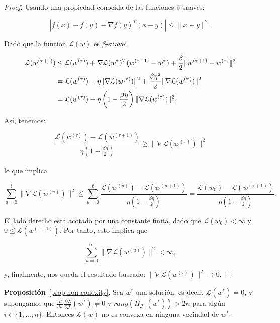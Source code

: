 \begin{proof}
  Usando una propiedad conocida de las funciones $\beta$-suaves:

  \[
      | f(x) - f(y) - \nabla f(y)^{T} (x-y) | \leq \| x - y \|^2.
  \]  

  Dado que la función $\mathcal{L}(w)$ es $\beta$-suave:

  \begin{align}
      \mathcal{L} (w^{(\tau + 1)}) &\leq \mathcal{L} (w^{(\tau)}) + \nabla \mathcal{L} (w^{\tau})^{T} (w^{(\tau + 1)} - w^{\tau}) + \frac{\beta}{2} \|w^{(\tau + 1)} - w^{(\tau)}\|^2 \notag \\
      &= \mathcal{L} (w^{(\tau)}) - \eta \|\nabla \mathcal{L} (w^{(\tau)})\|^2 + \frac{\beta \eta^2}{2} \|\nabla \mathcal{L} (w^{(\tau)})\|^2 \notag \\
      &= \mathcal{L} (w^{(\tau)}) - \eta \left( 1 - \frac{\beta \eta}{2} \right) \|\nabla \mathcal{L} (w^{(\tau)})\|^2.
  \end{align}

  Así, tenemos:

  \[
      \frac{\mathcal{L} (w^{(\tau)}) - \mathcal{L} (w^{(\tau + 1)})}{\eta \left( 1 - \frac{\beta \eta}{2} \right)} \geq \|\nabla \mathcal{L} (w^{(\tau)})\|^2
  \]

  lo que implica

  \[
      \sum_{u=0}^{t} \|\nabla \mathcal{L} (w^{(u)})\|^2 \leq \sum_{u=0}^{t} \frac{\mathcal{L} (w^{(u)}) - \mathcal{L} (w^{(u+1)})}{\eta \left( 1 - \frac{\beta \eta}{2} \right)} = \frac{\mathcal{L} (w_0) - \mathcal{L} (w^{(\tau + 1)})}{\eta \left( 1 - \frac{\beta \eta}{2} \right)}.
  \]

  El lado derecho está acotado por una constante finita, dado que $\mathcal{L} (w_0) < \infty$ y $0 \leq \mathcal{L} (w^{(\tau + 1)})$. Por tanto, esto implica que

  \[
      \sum_{u=0}^{\infty} \|\nabla \mathcal{L} (w^{(u)})\|^2 < \infty,
  \]

  y, finalmente, nos queda el resultado buscado: $\|\nabla \mathcal{L} (w^{(\tau)})\|^2 \to 0$.
\end{proof}

\textbf{Proposición}~\ref{prop:non-conexity}. Sea $w^{*}$ una solución, es decir, $\mathcal{L}(w^{*}) = 0$, y supongamos que $\frac{d}{dw}\frac{\partial \mathcal{L}}{\partial \mathcal{F}}(w^{*}) \neq 0$ y $rang(H_{\mathcal{F}_{i}}(w^{*})) > 2n$ para algún $i \in \{1, \ldots, n \}$. Entonces $\mathcal{L}(w)$ no es convexa en ninguna vecindad de $w^{*}$.

